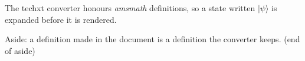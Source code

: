 \documentclass{article}
\newcommand{\pkg}[1]{\emph{#1}}
\newcommand{\ket}[1]{\lvert #1 \rangle}
\def\tool{techxt}
\newenvironment{aside}{Aside: }{ (end of aside)}
\begin{document}
The \tool{} converter honours \pkg{amsmath} definitions, so a state
written $\ket{\psi}$ is expanded before it is rendered.

\begin{aside}
a definition made in the document is a definition the converter keeps.
\end{aside}
\end{document}
